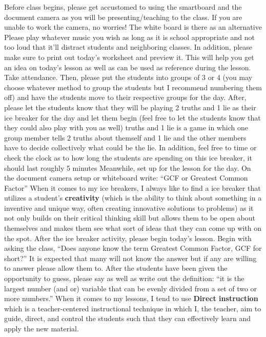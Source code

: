 \begin{outline}
    \1 Before class begins, please get accustomed to using the smartboard and the document camera as you will be presenting/teaching to the class. If you are unable to work the camera, no worries! The white board is there as an alternative
        \2 Please play whatever music you wish as long as it is school appropriate and not too loud that it'll distract students and neighboring classes.
        \2 In addition, please make sure to print out today's worksheet and preview it. This will help you get an idea on today's lesson as well as can be used as reference during the lesson.
    \1 Take attendance. Then, please put the students into groups of 3 or 4 (you may choose whatever method to group the students but I recommend numbering them off) and have the students move to their respective groups for the day. After, please let the students know that they will be playing 2 truths and 1 lie as their ice breaker for the day and let them begin (feel free to let the students know that they could also play with you as well)
         truths and 1 lie is a game in which one group member tells 2 truths about themself and 1 lie and the other members have to decide collectively what could be the lie. 
        \2 In addition, feel free to time or check the clock as to how long the students are spending on this ice breaker, it should last roughly 5 minutes
        \2 Meanwhile, set up for the lesson for the day. On the document camera setup or whiteboard write: “GCF or Greatest Common Factor”
            \3 When it comes to my ice breakers, I always like to find a ice breaker that utilizes a student's \textbf{creativity} (which is the ability to think about something in a inventive and unique way, often creating innovative solutions to problems) as it not only builds on their critical thinking skill but allows them to be open about themselves and makes them see what sort of ideas that they can come up with on the spot. 
    \1 After the ice breaker activity, please begin today's lesson. Begin with asking the class, “Does anyone know the term Greatest Common Factor, GCF for short?”
        \2 It is expected that many will not know the answer but if any are willing to answer please allow them to.
    \1 After the students have been given the opportunity to guess, please say as well as write out the definition: “it is the largest number (and or) variable that can be evenly divided from a set of two or more numbers.”
        \2 When it comes to my lessons, I tend to use \textbf{Direct instruction} which is a teacher-centered instructional technique in which I, the teacher, aim to guide, direct, and control the students such that they can effectively learn and apply the new material. 

\end{outline}

